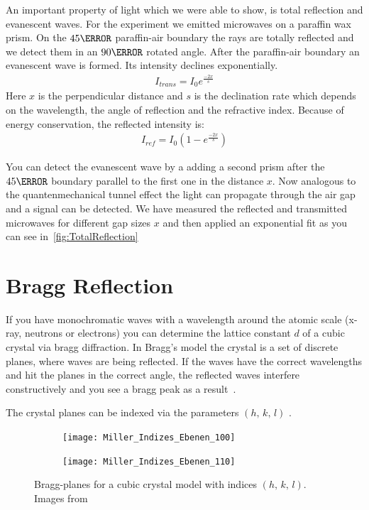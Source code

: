 \documentclass[a4paper,10pt,twocolumn]{article}
\begin{document}
    
    An important property of light which we were able to show, is total reflection and evanescent waves.
    For the experiment we emitted microwaves on a paraffin wax prism. 
    On the $45\degree$ paraffin-air boundary the rays are totally reflected and we detect them in an $90\degree$ rotated
    angle. 
    After the paraffin-air boundary an evanescent wave is formed.
    Its intensity declines exponentially.
    \begin{align}
        \label{eq:ExpTransDecline}
        I_{trans} = I_0 e^{\frac{-2x}{s}} 
    \end{align}
    Here $x$ is the perpendicular distance and $s$ is the declination rate which depends on the wavelength, 
    the angle of reflection and the refractive index.
    Because of energy conservation, the reflected intensity is:
    \begin{align*}
        I_{ref} = I_0 (1 - e^{\frac{-2x}{s}})
    \end{align*}
    

    You can detect the evanescent wave by a adding a second prism after the $ 45\degree$ boundary parallel to the first one
    in the distance $x$.
    Now analogous to the quantenmechanical tunnel effect\cite{gerth} the light can propagate through the air gap and a signal can be
    detected.
    We have measured the reflected and transmitted microwaves for different gap sizes $x$ and then applied an exponential 
    fit as you can see in~\ref{fig:TotalReflection}
    

    \section{Bragg Reflection}
    If you have monochromatic waves with a wavelength around the atomic scale (x-ray, neutrons or electrons) you can
    determine the lattice constant $d$ of a cubic crystal via bragg diffraction. 
    In Bragg's model the crystal is a set of discrete planes, where waves are being reflected.
    If the waves have the correct wavelengths and hit the planes in the correct angle, the reflected waves interfere 
    constructively and you see a bragg peak as a result~\cite{gerth}.
    
    The crystal planes can be indexed via the parameters $(h,\,k,\,l)$ .
    \begin{figure}[htbp]
        \centering
        \begin{subfigure}{0.49\linewidth}
            \centering
            \texttt{[image: Miller\_Indizes\_Ebenen\_100]}
        \end{subfigure}
        \begin{subfigure}{0.49\linewidth}
            \centering
            \texttt{[image: Miller\_Indizes\_Ebenen\_110]}
        \end{subfigure}
        \caption{Bragg-planes for a cubic crystal model with indices $(h,\,k,\,l)$.
        Images from ~\cite{miller}}
        \label{fig:BraggPlanesIndices}
    \end{figure}
\end{document}
